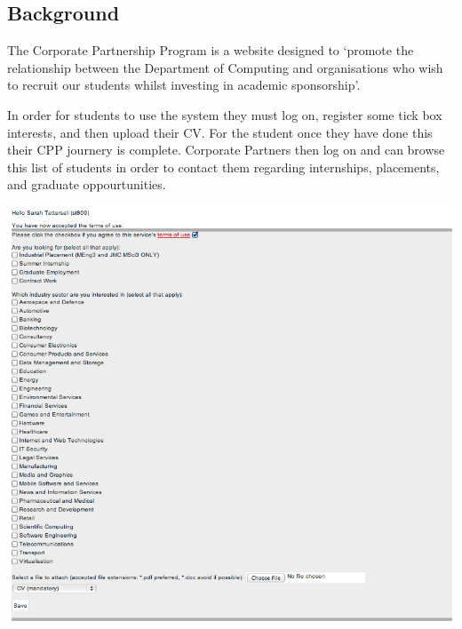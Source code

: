 \subsection{Background}
The Corporate Partnership Program is a website designed to `promote the relationship between the Department of Computing and organisations who wish to recruit our students whilst investing in academic sponsorship'\cite{doc-cpp}.

In order for students to use the system they must log on, register some tick box interests, and then upload their CV.
For the student once they have done this their CPP journery is complete.
Corporate Partners then log on and can browse this list of students in order to contact them regarding internships, placements, and graduate oppourtunities.

\begin{center}
\includegraphics[scale=0.5]{images/introduction/old_cpp}
\end{center}
